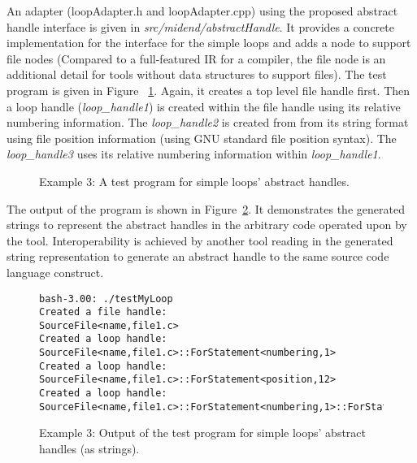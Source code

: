 An adapter (loopAdapter.h and loopAdapter.cpp) using the proposed abstract
handle interface is given in \textit{src/midend/abstractHandle}.
It provides a concrete implementation for the interface for the simple loops and adds a
node to support file nodes (Compared to a full-featured IR for a compiler, the
file node is an additional detail for tools without data structures to support files).
The test program is given in Figure ~\ref{Tutorial:testMyLoop}.
Again, it creates a top level file handle first. Then a loop handle
({\em loop\_handle1}) is created within the file handle using its relative numbering information. 
The {\em loop\_handle2} is created from from its string format using file position
information (using GNU standard file position syntax). The {\em loop\_handle3} uses its
relative numbering information within {\em loop\_handle1}.

\begin{figure}[!h]
{\indent
{\mySmallFontSize
\begin{latexonly}
  
\end{latexonly}

\begin{htmlonly}
   
\end{htmlonly}

}
}
\caption{Example 3: A test program for simple loops' abstract handles.}
\label{Tutorial:testMyLoop}
\end{figure}


The output of the program is shown in Figure~\ref{Tutorial:testMyLoopOutput}.  It
demonstrates the generated strings to represent the abstract handles in the 
arbitrary code operated upon by the tool.  Interoperability is achieved by 
another tool reading in the generated string representation to generate an
abstract handle to the same source code language construct.
\begin{figure}[!h]
{\indent
{\mySmallFontSize
\begin{latexonly}
\begin{lstlisting} 
bash-3.00: ./testMyLoop
Created a file handle:
SourceFile<name,file1.c>
Created a loop handle:
SourceFile<name,file1.c>::ForStatement<numbering,1>
Created a loop handle:
SourceFile<name,file1.c>::ForStatement<position,12>
Created a loop handle:
SourceFile<name,file1.c>::ForStatement<numbering,1>::ForStatement<numbering,1>
\end{lstlisting}
\end{latexonly}
}
}
\caption{Example 3: Output of the test program for simple loops' abstract handles (as strings).}
\label{Tutorial:testMyLoopOutput}
\end{figure}

